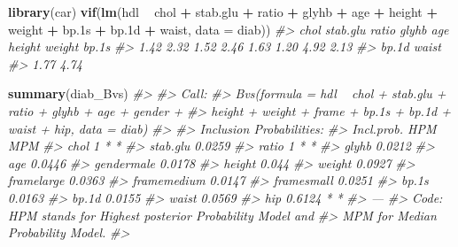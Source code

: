 \documentclass[]{book}
\newenvironment{Shaded}{\begin{snugshade}}{\end{snugshade}}
\newcommand{\KeywordTok}[1]{\textcolor[rgb]{0.13,0.29,0.53}{\textbf{#1}}}
\newcommand{\DataTypeTok}[1]{\textcolor[rgb]{0.13,0.29,0.53}{#1}}
\newcommand{\StringTok}[1]{\textcolor[rgb]{0.31,0.60,0.02}{#1}}
\newcommand{\CommentTok}[1]{\textcolor[rgb]{0.56,0.35,0.01}{\textit{#1}}}
\newcommand{\OperatorTok}[1]{\textcolor[rgb]{0.81,0.36,0.00}{\textbf{#1}}}
\newcommand{\NormalTok}[1]{#1}
\begin{document}
\begin{Shaded}
\begin{Highlighting}[]
\KeywordTok{library}\NormalTok{(car)}
\KeywordTok{vif}\NormalTok{(}\KeywordTok{lm}\NormalTok{(hdl }\OperatorTok{~}\StringTok{ }\NormalTok{chol }\OperatorTok{+}\StringTok{ }\NormalTok{stab.glu }\OperatorTok{+}\StringTok{ }\NormalTok{ratio }\OperatorTok{+}\StringTok{ }\NormalTok{glyhb }\OperatorTok{+}\StringTok{ }\NormalTok{age }\OperatorTok{+}\StringTok{ }\NormalTok{height }\OperatorTok{+}\StringTok{ }\NormalTok{weight }\OperatorTok{+}\StringTok{  }\NormalTok{bp.1s }\OperatorTok{+}\StringTok{ }\NormalTok{bp.1d }\OperatorTok{+}\StringTok{ }\NormalTok{waist, }\DataTypeTok{data =}\NormalTok{ diab))}
\CommentTok{#>     chol stab.glu    ratio    glyhb      age   height   weight    bp.1s }
\CommentTok{#>     1.42     2.32     1.52     2.46     1.63     1.20     4.92     2.13 }
\CommentTok{#>    bp.1d    waist }
\CommentTok{#>     1.77     4.74}
\end{Highlighting}
\end{Shaded}

\begin{Shaded}
\begin{Highlighting}[]
\KeywordTok{summary}\NormalTok{(diab_Bvs)}
\CommentTok{#> }
\CommentTok{#> Call:}
\CommentTok{#> Bvs(formula = hdl ~ chol + stab.glu + ratio + glyhb + age + gender + }
\CommentTok{#>     height + weight + frame + bp.1s + bp.1d + waist + hip, data = diab)}
\CommentTok{#> }
\CommentTok{#> Inclusion Probabilities:}
\CommentTok{#>             Incl.prob. HPM MPM}
\CommentTok{#> chol                 1   *   *}
\CommentTok{#> stab.glu        0.0259        }
\CommentTok{#> ratio                1   *   *}
\CommentTok{#> glyhb           0.0212        }
\CommentTok{#> age             0.0446        }
\CommentTok{#> gendermale      0.0178        }
\CommentTok{#> height           0.044        }
\CommentTok{#> weight          0.0927        }
\CommentTok{#> framelarge      0.0363        }
\CommentTok{#> framemedium     0.0147        }
\CommentTok{#> framesmall      0.0251        }
\CommentTok{#> bp.1s           0.0163        }
\CommentTok{#> bp.1d           0.0155        }
\CommentTok{#> waist           0.0569        }
\CommentTok{#> hip             0.6124   *   *}
\CommentTok{#> ---}
\CommentTok{#> Code: HPM stands for Highest posterior Probability Model and}
\CommentTok{#>  MPM for Median Probability Model.}
\CommentTok{#> }
\end{Highlighting}
\end{Shaded}
\end{document}
